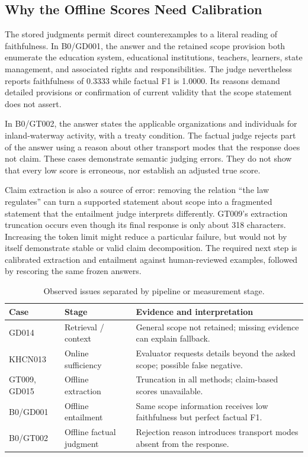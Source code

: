 \documentclass[11pt,a4paper,oneside]{report}
\begin{document}
\subsection{Why the Offline Scores Need Calibration}
The stored judgments permit direct counterexamples to a literal reading of faithfulness. In B0/GD001, the answer and the retained scope provision both enumerate the education system, educational institutions, teachers, learners, state management, and associated rights and responsibilities. The judge nevertheless reports faithfulness of 0.3333 while factual F1 is 1.0000. Its reasons demand detailed provisions or confirmation of current validity that the scope statement does not assert.

In B0/GT002, the answer states the applicable organizations and individuals for inland-waterway activity, with a treaty condition. The factual judge rejects part of the answer using a reason about other transport modes that the response does not claim. These cases demonstrate semantic judging errors. They do not show that every low score is erroneous, nor establish an adjusted true score.

Claim extraction is also a source of error: removing the relation ``the law regulates'' can turn a supported statement about scope into a fragmented statement that the entailment judge interprets differently. GT009's extraction truncation occurs even though its final response is only about 318 characters. Increasing the token limit might reduce a particular failure, but would not by itself demonstrate stable or valid claim decomposition. The required next step is calibrated extraction and entailment against human-reviewed examples, followed by rescoring the same frozen answers.

\begin{table}[H]\centering\small
\caption{Observed issues separated by pipeline or measurement stage.}\label{tab:issues}
\begin{tabularx}{\textwidth}{P{2.3cm}P{3cm}Y}\toprule
\textbf{Case} & \textbf{Stage} & \textbf{Evidence and interpretation}\\\midrule
GD014 & Retrieval / context & General scope not retained; missing evidence can explain fallback.\\
KHCN013 & Online sufficiency & Evaluator requests details beyond the asked scope; possible false negative.\\
GT009, GD015 & Offline extraction & Truncation in all methods; claim-based scores unavailable.\\
B0/GD001 & Offline entailment & Same scope information receives low faithfulness but perfect factual F1.\\
B0/GT002 & Offline factual judgment & Rejection reason introduces transport modes absent from the response.\\\bottomrule
\end{tabularx}
\end{table}
\end{document}
